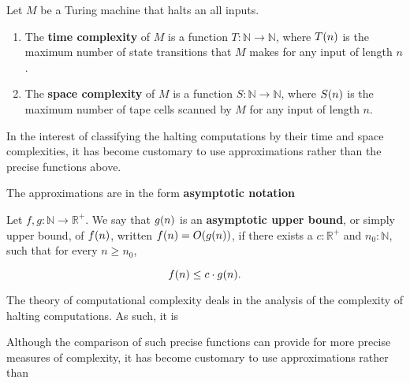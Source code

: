 \begin{definition} Let $M$ be a Turing machine that halts an all inputs.

\begin{enumerate}

\item The \textbf{time complexity} of $M$ is a function
$T:\mathbb{N}\rightarrow \mathbb{N}$, where $T{\mathopen{}\left({n}\right)\mathclose{}}$ is the maximum number of
state transitions that $M$ makes for any input of length $n$.

\item The \textbf{space complexity} of $M$ is a function
$S:\mathbb{N}\rightarrow \mathbb{N}$, where $S{\mathopen{}\left({n}\right)\mathclose{}}$ is the maximum number of
tape cells scanned by $M$ for any input of length $n$.

\end{enumerate}

\end{definition}

In the interest of classifying the halting computations by their time and space
complexities, it has become customary to use approximations rather than the
precise functions above.

The approximations are in the form \textbf{asymptotic notation}

\begin{definition} Let $f,g:\mathbb{N}\rightarrow \mathbb{R}^+$. We say that
$g{\mathopen{}\left({n}\right)\mathclose{}}$ is an \textbf{asymptotic upper bound}, or simply upper bound, of
$f{\mathopen{}\left({n}\right)\mathclose{}}$, written $f{\mathopen{}\left({n}\right)\mathclose{}}=O{\mathopen{}\left({g{\mathopen{}\left({n}\right)\mathclose{}}}\right)\mathclose{}}$, if there exists a $c:\mathbb{R}^+$ and
$n_0:\mathbb{N}$, such that for every $n\geq n_0$,

$$f{\mathopen{}\left({n}\right)\mathclose{}}\leq c\cdot g{\mathopen{}\left({n}\right)\mathclose{}}.$$

\end{definition}


The theory of computational complexity deals in the analysis of the complexity
of halting computations. As such, it is 

Although the comparison of such precise functions can provide for more precise measures of complexity, it has become customary to use approximations rather than 



